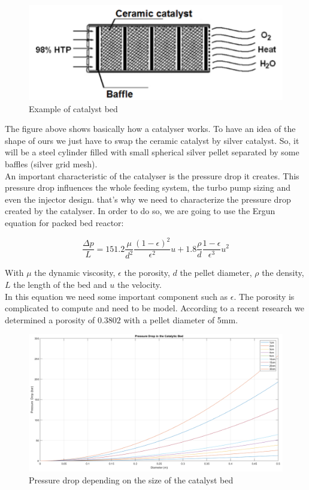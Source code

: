 \begin{figure}[H]
	\centering
	\includegraphics{catalyst}
	\caption{Example of catalyst bed}
\end{figure}

The figure above shows basically how a catalyser works. To have an idea of the shape of ours we just have to swap the ceramic catalyst by silver catalyst. So, it will be a steel cylinder filled with small spherical silver pellet separated by some baffles (silver grid mesh). \\

An important characteristic of the catalyser is the pressure drop it creates. This pressure drop influences the whole feeding system, the turbo pump sizing and even the injector design. that's why we need to characterize the pressure drop created by the catalyser. In order to do so, we are going to use the Ergun equation for packed bed reactor:

$$
\frac{\Delta p}{L} = 151.2 \frac{\mu}{d^2}\frac{(1-\epsilon)^2}{\epsilon^2}u + 1.8 \frac{\rho}{d}\frac{1- \epsilon}{\epsilon^3}u^2
$$

With $\mu$ the dynamic viscosity, $\epsilon$ the porosity, $d$ the pellet diameter, $\rho$ the density, $L$ the length of the bed and $u$ the velocity. \\

In this equation we need some important component such as $\epsilon$. The porosity is complicated to compute and need to be model. According to a recent research we determined a porosity of $0.3802$ with a pellet diameter of 5mm.

\begin{figure}[H]
	\centering
	\includegraphics[width=\linewidth]{pressuredrop}
	\caption{Pressure drop depending on the size of the catalyst bed}
\end{figure}

